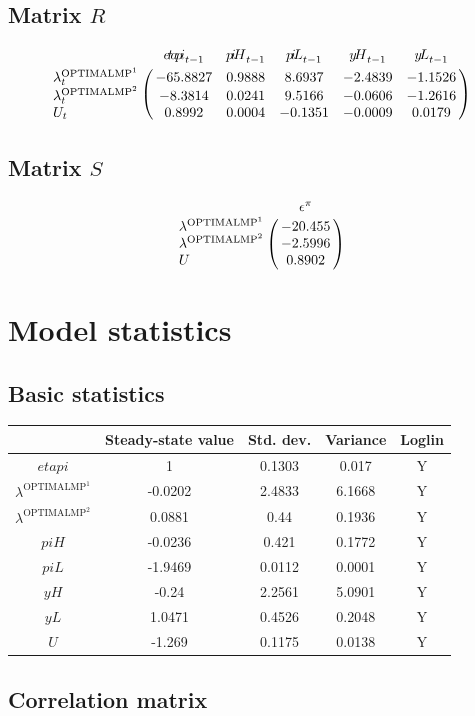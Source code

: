 \subsection*{Matrix $R$}

$$\bordermatrix{
~ & {e\!t\!a\!p\!i}_{t-1} & {p\!i\!H}_{t-1} & {p\!i\!L}_{t-1} & {y\!H}_{t-1} & {y\!L}_{t-1} \cr
\lambda^{\mathrm{OPTIMALMP}^{\mathrm{1}}}_{t} & -65.8827 & 0.9888 & 8.6937 & -2.4839 & -1.1526 \cr
\lambda^{\mathrm{OPTIMALMP}^{\mathrm{2}}}_{t} & -8.3814 & 0.0241 & 9.5166 & -0.0606 & -1.2616 \cr
U_{t} & 0.8992 & 0.0004 & -0.1351 & -0.0009 & 0.0179 \cr
}$$

\subsection*{Matrix $S$}

$$\bordermatrix{
~ & \epsilon^{\pi} \cr
\lambda^{\mathrm{OPTIMALMP}^{\mathrm{1}}} & -20.455 \cr
\lambda^{\mathrm{OPTIMALMP}^{\mathrm{2}}} & -2.5996 \cr
U & 0.8902 \cr
}$$


\section{Model statistics}

\subsection{Basic statistics}

\begin{tabular}{c|c|c|c|c|}
  & Steady-state value & Std. dev. & Variance & Loglin\\
\hline
${e\!t\!a\!p\!i}$ & 1 & 0.1303 & 0.017 & Y    \\
$\lambda^{\mathrm{OPTIMALMP}^{\mathrm{1}}}$ & -0.0202 & 2.4833 & 6.1668 & Y    \\
$\lambda^{\mathrm{OPTIMALMP}^{\mathrm{2}}}$ & 0.0881 & 0.44 & 0.1936 & Y    \\
${p\!i\!H}$ & -0.0236 & 0.421 & 0.1772 & Y    \\
${p\!i\!L}$ & -1.9469 & 0.0112 & 0.0001 & Y    \\
${y\!H}$ & -0.24 & 2.2561 & 5.0901 & Y    \\
${y\!L}$ & 1.0471 & 0.4526 & 0.2048 & Y    \\
$U$ & -1.269 & 0.1175 & 0.0138 & Y    \\
\hline
\end{tabular}


\subsection{Correlation matrix}

